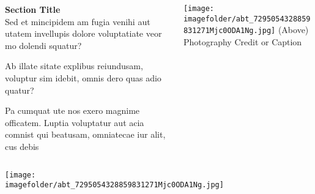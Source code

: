 \documentclass[
	aspectratio=169, %
	t, %
	onlytextwidth, %
	10pt, %
]{beamer}
\def\imagefolder{../ImperialTheme/Images/}
\begin{document}

\begin{frame}
	\begin{columns}[T] %
		\begin{column}{0.48\linewidth} %
			\textbf{Section Title}\\
			Sed et mincipidem am fugia venihi aut utatem invellupis dolore voluptatiate veor mo dolendi squatur?

			Ab illate sitate explibus reiundusam, voluptur sim idebit, omnis dero quas adio quatur?

			Pa cumquat ute nos exero magnime officatem. Luptia voluptatur aut acia comnist qui beatusam, omniatecae iur alit, cus debis
		\end{column}
		\begin{column}{0.48\linewidth} %
			\texttt{[image: \\imagefolder/abt\_7295054328859831271Mjc0ODA1Ng.jpg]} %
			{\tiny\textcolor{ICLBlue}{(Above) Photography Credit or Caption}}
		\end{column}
	\end{columns}
\end{frame}


\begin{frame}
	\texttt{[image: \\imagefolder/abt\_7295054328859831271Mjc0ODA1Ng.jpg]} %
\end{frame}


\begingroup
	
	\begin{frame}[plain] %
	\end{frame}
\endgroup

\end{document}
